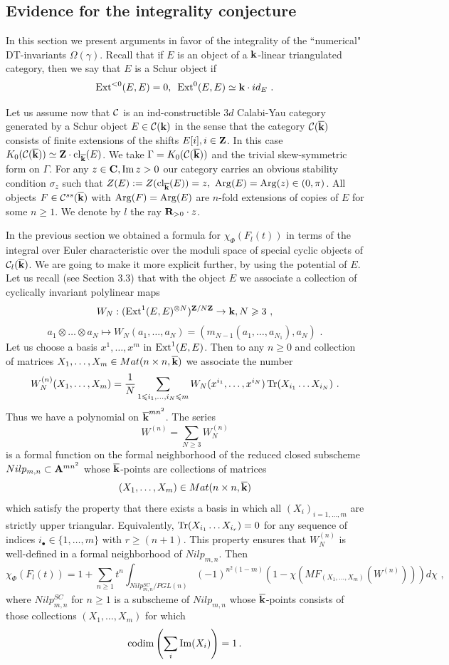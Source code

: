 \documentclass[12pt]{article}
\begin{document}
\subsection{Evidence for the integrality conjecture}

In this section we present arguments in favor of the integrality of the ``numerical" DT-invariants $\Omega(\gamma)$. Recall that if $E$ is an object of a ${\bf k}$-linear triangulated category, then we say that $E$ is a Schur object if 
$$\operatorname{Ext}^{<0}(E,E)=0,\,\,\,\operatorname{Ext}^0(E,E)\simeq {\bf k}\cdot id_E\,\,.$$

Let us assume now that ${\mathcal C}$ is an ind-constructible $3d$ Calabi-Yau category generated by a Schur object $E\in {\mathcal C}({\bf k})$ in the sense that the category ${\mathcal C}(\overline{{\bf k}})$ consists of finite extensions of the shifts $E[i], i\in {\bf Z}$. In this case $K_0({\mathcal C}(\overline{{\bf k}}))\simeq {\bf Z}\cdot \operatorname{cl}_{{\overline{\bf k}}}(E)$. We take
$\Gamma=K_0({\mathcal C}(\overline{{\bf k}}))$ and the trivial skew-symmetric form on $\Gamma$.
For any $z\in {\bf C}, \operatorname{Im}z>0$ our category carries an obvious stability condition $\sigma_z$ such that $Z(E):=Z(\operatorname{cl}_{{\overline{\bf k}}}(E))=z,\,\, \operatorname{Arg}(E)=\operatorname{Arg}(z)\in (0,\pi)$. All objects $F\in {\mathcal C}^{ss}(\overline{{\bf k}})$ with $\operatorname{Arg}(F)=\operatorname{Arg}(E)$ are $n$-fold extensions of copies of $E$ for some $n\geqslant 1$. We denote by $l$ the ray ${\bf R}_{>0}\cdot z$.

In the previous section we obtained a formula for ${\chi}_{\Phi}(F_l(t))$ in terms of the integral over Euler characteristic over the moduli space of special cyclic objects of ${\mathcal C}_l({\overline{\bf k}})$. We are going to make it more explicit further, by using the potential of $E$. Let us recall (see Section 3.3) that with the object $E$ we associate a collection of cyclically invariant polylinear maps 
$$W_N: (\operatorname{Ext}^1(E,E)^{\otimes N})^{{\bf Z}/N{\bf Z}}\to {\bf k}, N\geqslant 3\,\,,$$
$$ a_1\otimes\dots\otimes a_N\mapsto W_N(a_1,\dots,a_N)=(m_{N-1}(a_1,\dots,a_{N_1}),a_N)\,\,.$$
 Let us choose a basis $x^1,\dots,x^m$ in $\operatorname{Ext}^1(E,E)$. Then to any $n\geqslant 0$ and collection of matrices $X_1,\dots,X_m\in Mat(n\times n,{\overline{\bf k}})$ we associate the number
$$W_N^{(n)}(X_1,\dots,X_m)={1\over{N}}\sum_{1\leqslant i_1,\dots,i_N\leqslant m}W_N(x^{i_1},\dots,x^{i_N})\operatorname{Tr}(X_{i_1}\dots
X_{i_N})\,\,.$$
Thus we have a polynomial on ${\overline{\bf k}}^{mn^2}$. The series
$$W^{(n)}=\sum_{N\geqslant 3}W_N^{(n)}$$
is a formal function on the formal neighborhood of the reduced closed subscheme $Nilp_{m,n}\subset {\bf A}^{mn^2}$ whose ${\overline{\bf k}}$-points are collections of matrices 
$$(X_1,\dots,X_m)\in Mat(n\times n,{\overline{\bf k}})$$
 which satisfy the property that there exists a basis in which all $(X_i)_{i=1,\dots, m}$
 are strictly upper triangular. Equivalently, $\operatorname{Tr}(X_{i_1}\dots X_{i_r})=0$ for any sequence of indices $i_\bullet \in \{1,\dots,m\}$ with $r\ge (n+1)$.
 This property ensures that $W_N^{(n)}$ is well-defined in a formal neighborhood of $Nilp_{m,n}$.
Then
$$
\chi_\Phi(F_l(t))=1+\sum_{n\geqslant 1}t^n\int_{ Nilp_{m,n}^{SC}/PGL(n)}(-1)^{n^2(1-m)}(1-\chi(MF_{(X_1,\dots,X_m)}(W^{(n)})))d\chi\,\,,
$$
where $Nilp_{m,n}^{SC}$ for $n\geqslant 1$ is a subscheme of $Nilp_{m,n}$ whose ${\overline{\bf k}}$-points consists  of those collections $(X_1,\dots,X_m)$ for which 
$$\operatorname{codim}\left(\sum_i \operatorname{Im}(X_i)\right)=1\,.$$
\end{document}
